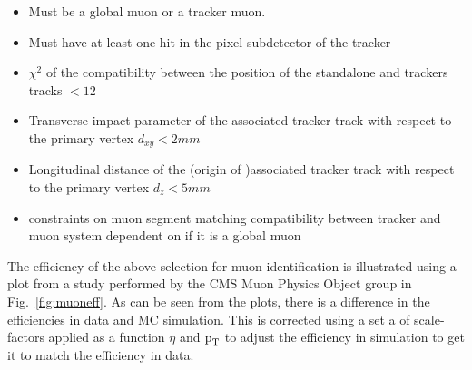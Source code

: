 \begin{itemize}
\item Must be a global muon or a tracker muon.
\item Must have at least one hit in the pixel subdetector of the tracker
\item $\chi^2$ of the compatibility between the position of the standalone and trackers tracks $<12$
\item Transverse impact parameter of the associated tracker track with respect to the primary vertex $d_{xy}< 2 mm$
\item Longitudinal distance of the (origin of )associated tracker track with respect to the primary vertex $d_z <5 mm$
\item constraints on muon segment matching compatibility between tracker and muon system dependent on if it is a global muon
\end{itemize}
The efficiency of the above selection for muon identification is illustrated using a plot from a study performed by the CMS Muon Physics Object group in Fig.~\ref{fig:muoneff}. As can be seen from the plots, there is a difference in the efficiencies in data and MC simulation. This is corrected using a set a of scale-factors applied as a function $\eta$ and $\text{p}_\text{T}$ to adjust the efficiency in simulation to get it to match the efficiency in data.  

